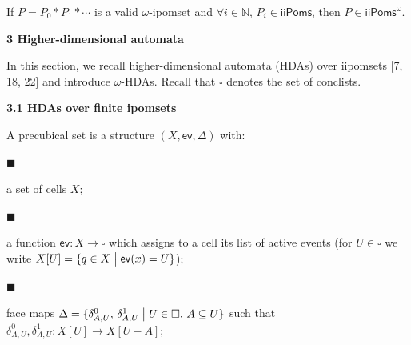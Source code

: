  
If $P=P_{0}*P_{1}*\cdots$ is a valid $\omega$-ipomset and $\forall i\in\mathbb{N},\,P_{i}\in\mathsf{iiPoms}$, then $P\in{\mathsf{iiPoms}^{\omega}}$.\par
 
 
 
 
 


 
\par\medskip\noindent\textbf{3 Higher-dimensional automata}\par
 
 
In this section, we recall higher-dimensional automata (HDAs) over iipomsets [7, 18, 22] and introduce $\omega$-HDAs. Recall that $\square$ denotes the set of conclists.\par
 
 
 
\par\medskip\noindent\textbf{3.1 HDAs over finite ipomsets}\par
 
 
A precubical set is a structure $(X,\mathsf{ev},\Delta)$ with:\par
  
\par\noindent  $\blacksquare$ 
 
a set of cells $X$;\par
 
 
 
\par\noindent  $\blacksquare$ 
 
a function $\mathsf{ev}:X\rightarrow\square$ which assigns to a cell its list of active events (for $U\in\square$ we write $X[U]={\{q\in X\mathrel{\big{|}}\mathsf{ev}(x)=U\}}$);\par
 
 
 
\par\noindent  $\blacksquare$ 
 
face maps $\Delta={\{\delta_{A,U}^{0},\,\delta_{A,U}^{1}\mathrel{\big{|}}U\in\square,\,A\subseteq U\}}$ such that $\delta_{A,U}^{0},\delta_{A,U}^{1}:X[U]\rightarrow X[U-A]$;\par
 
